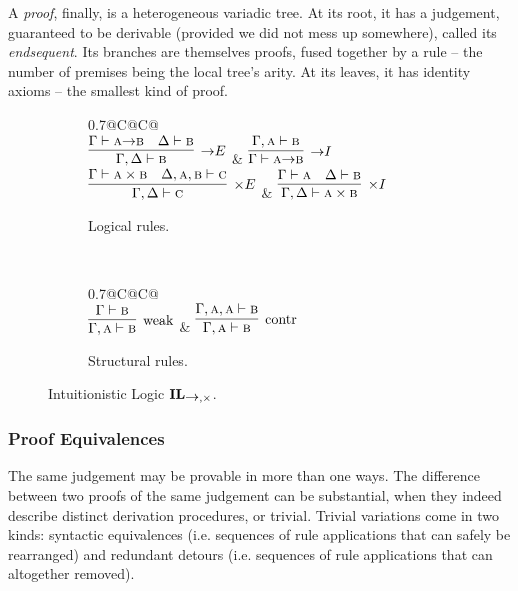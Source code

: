 A \textit{proof}, finally, is a heterogeneous variadic tree.
At its root, it has a judgement, guaranteed to be derivable (provided we did not mess up somewhere), called its \textit{endsequent}.
Its branches are themselves proofs, fused together by a rule -- the number of premises being the local tree's arity.
At its leaves, it has identity axioms -- the smallest kind of proof.

\begin{figure}
	\centering
	\begin{subfigure}{1\textwidth}
		\centering
		\begin{tabularx}{0.7\textwidth}{@{}C@{\qquad}C@{}}
		\\[\smallsep]
		$\infer[\ii E]{\Gamma, \Delta \vdash \prop B}{\Gamma \vdash \prop A \ii \prop B & \Delta \vdash \prop B}$ 
		& 
		$\infer[\ii I]{\Gamma \vdash \prop A \ii \prop B}{\Gamma, \prop A \vdash \prop B}$\\[\smallsep]
		$\infer[\times E]{\Gamma,\Delta \vdash \prop C}{\Gamma \vdash \prop A \times \prop B & \Delta, \prop A , \prop B \vdash \prop C}$ 
		&
		$\infer[\times I]{\Gamma, \Delta \vdash \prop A \times \prop B}{\Gamma \vdash \prop A & \Delta \vdash \prop B}$
		\end{tabularx}
		\caption{Logical rules.}
		\label{subfigure:intuitionistic_logic_rules:logical}
	\end{subfigure}\\[\midsep]
	\begin{subfigure}{1\textwidth}
		\centering
		\begin{tabularx}{0.7\textwidth}{@{}C@{\qquad}C@{}}
		\\[\smallsep]
		$\infer[\Weakening{}]{\Gamma, \prop A \vdash \prop B}{\Gamma \vdash \prop B} $ 
		&
		$\infer[\Contraction{}]{\Gamma, \prop A \vdash \prop B}{\Gamma, \prop A, \prop A \vdash \prop B}$
		\end{tabularx}
		\caption{Structural rules.}
		\label{subfigure:intuitionistic_logic_rules:structural}
	\end{subfigure}
	\caption{Intuitionistic Logic $\IL_{\ii,\times}$.}
	\label{figure:intuitioistic_logic_rules}
\end{figure}

\subsubsection{Proof Equivalences}
The same judgement may be provable in more than one ways.
The difference between two proofs of the same judgement can be substantial, when they indeed describe distinct derivation procedures, or trivial.
Trivial variations come in two kinds: syntactic equivalences (i.e. sequences of rule applications that can safely be rearranged) and redundant detours (i.e. sequences of rule applications that can altogether removed).

